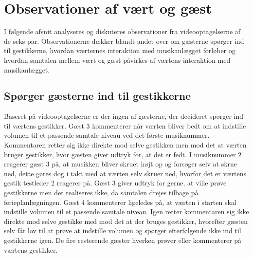 \section{Observationer af vært og gæst}
\label{TestresultaterSocialAcceptGestikkerObservationer}
%
I følgende afsnit analyseres og diskuteres observationer fra videooptagelserne af de seks par. Observationerne dækker blandt andet over om gæsterne spørger ind til gestikkerne, hvordan værternes interaktion med musikanlægget forløber og hvordan samtalen mellem vært og gæst påvirkes af værtens interaktion med musikanlægget.
%
\subsection{Spørger gæsterne ind til gestikkerne}
\label{TestresultaterSocialAcceptGaestSPGGestikker}
%
Baseret på videooptagelserne er der ingen af gæsterne, der decideret spørger ind til værtens gestikker. Gæst 3 kommenterer når værten bliver bedt om at indstille volumen til et passende samtale niveau ved det første musiknummer. Kommentaren retter sig ikke direkte mod selve gestikken men mod det at værten bruger gestikker, hvor gæsten giver udtryk for, at det er fedt. I musiknummer 2 reagerer gæst 3 på, at musikken bliver skruet højt op og forsøger selv at skrue ned, dette gøres dog i takt med at værten selv skruer ned, hvorfor det er værtens gestik testleder 2 reagerer på. Gæst 3 giver udtryk for gerne, at ville prøve gestikkerne men det realiseres ikke, da samtalen drejes tilbage på ferieplanlægningen. Gæst 4 kommenterer ligeledes på, at værten i starten skal indstille volumen til et passende samtale niveau. Igen retter kommentaren sig ikke direkte mod selve gestikke med mod det at der bruges gestikker, hvorefter gæsten selv får lov til at prøve at indstille volumen og spørger efterfølgende ikke ind til gestikkerne igen. De fire resterende gæster hverken prøver eller kommenterer på værtens gestikker.  
%
